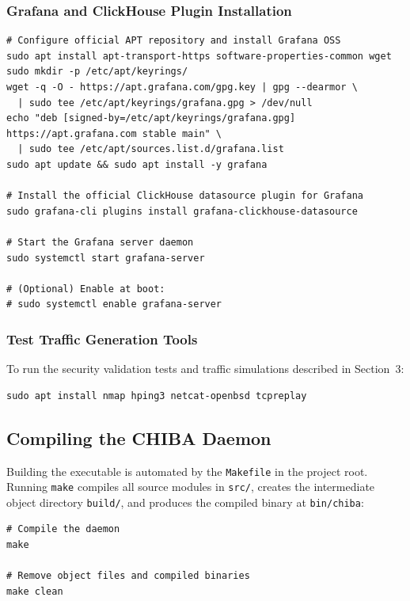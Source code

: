 \documentclass[11pt,a4paper]{article}
\newenvironment{codebox}[1][]{%
    \begin{tcolorbox}[
        colback=codebg,
        colframe=codeframe,
        boxrule=0.6pt,
        arc=1.5mm,
        left=3mm,
        right=3mm,
        top=2mm,
        bottom=2mm,
        fonttitle=\sffamily\bfseries\footnotesize,
        coltitle=chibadark,
        colbacktitle=codeframe!50!white,
        #1
    ]
}{%
    \end{tcolorbox}
}
\begin{document}
\subsubsection{Grafana and ClickHouse Plugin Installation}
\begin{codebox}[title={Grafana OSS and ClickHouse Datasource Plugin Installation}]
\footnotesize
\begin{verbatim}
# Configure official APT repository and install Grafana OSS
sudo apt install apt-transport-https software-properties-common wget
sudo mkdir -p /etc/apt/keyrings/
wget -q -O - https://apt.grafana.com/gpg.key | gpg --dearmor \
  | sudo tee /etc/apt/keyrings/grafana.gpg > /dev/null
echo "deb [signed-by=/etc/apt/keyrings/grafana.gpg] https://apt.grafana.com stable main" \
  | sudo tee /etc/apt/sources.list.d/grafana.list
sudo apt update && sudo apt install -y grafana

# Install the official ClickHouse datasource plugin for Grafana
sudo grafana-cli plugins install grafana-clickhouse-datasource

# Start the Grafana server daemon
sudo systemctl start grafana-server

# (Optional) Enable at boot:
# sudo systemctl enable grafana-server
\end{verbatim}
\end{codebox}

\subsubsection{Test Traffic Generation Tools}
To run the security validation tests and traffic simulations described in Section~3:
\begin{codebox}[title={Traffic Simulation Utilities}]
\footnotesize
\begin{verbatim}
sudo apt install nmap hping3 netcat-openbsd tcpreplay
\end{verbatim}
\end{codebox}

\subsection{Compiling the CHIBA Daemon}
Building the executable is automated by the \texttt{Makefile} in the project root. Running \texttt{make} compiles all source modules in \texttt{src/}, creates the intermediate object directory \texttt{build/}, and produces the compiled binary at \texttt{bin/chiba}:
\begin{codebox}[title={Compiling and Cleaning}]
\footnotesize
\begin{verbatim}
# Compile the daemon
make

# Remove object files and compiled binaries
make clean
\end{verbatim}
\end{codebox}
\end{document}

